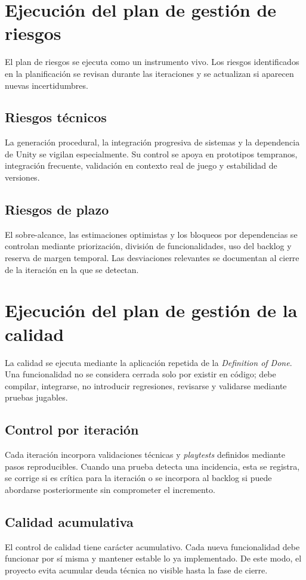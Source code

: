 \section{Ejecución del plan de gestión de riesgos}
El plan de riesgos se ejecuta como un instrumento vivo. Los riesgos identificados en la
planificación se revisan durante las iteraciones y se actualizan si aparecen nuevas
incertidumbres.

\subsection{Riesgos técnicos}
La generación procedural, la integración progresiva de sistemas y la dependencia de Unity se
vigilan especialmente. Su control se apoya en prototipos tempranos, integración frecuente,
validación en contexto real de juego y estabilidad de versiones.

\subsection{Riesgos de plazo}
El sobre-alcance, las estimaciones optimistas y los bloqueos por dependencias se controlan
mediante priorización, división de funcionalidades, uso del backlog y reserva de margen
temporal. Las desviaciones relevantes se documentan al cierre de la iteración en la que se
detectan.

\section{Ejecución del plan de gestión de la calidad}
La calidad se ejecuta mediante la aplicación repetida de la \textit{Definition of Done}. Una
funcionalidad no se considera cerrada solo por existir en código; debe compilar, integrarse,
no introducir regresiones, revisarse y validarse mediante pruebas jugables.

\subsection{Control por iteración}
Cada iteración incorpora validaciones técnicas y \textit{playtests} definidos mediante pasos
reproducibles. Cuando una prueba detecta una incidencia, esta se registra, se corrige si es
crítica para la iteración o se incorpora al backlog si puede abordarse posteriormente sin
comprometer el incremento.

\subsection{Calidad acumulativa}
El control de calidad tiene carácter acumulativo. Cada nueva funcionalidad debe funcionar
por sí misma y mantener estable lo ya implementado. De este modo, el proyecto evita acumular
deuda técnica no visible hasta la fase de cierre.


